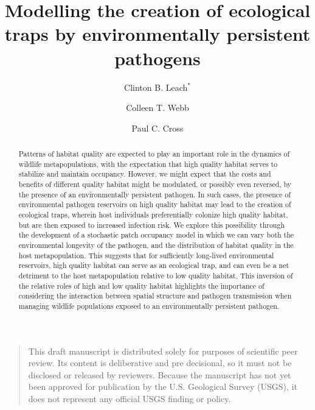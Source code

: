 \documentclass{article}
\begin{document}
\title{Modelling the creation of ecological traps by environmentally persistent pathogens}

\author[1]{Clinton B. Leach$^*$}
\author[1]{Colleen T. Webb}
\author[2]{Paul C. Cross}


\maketitle


\begin{quote}
This draft manuscript is distributed solely for purposes of scientific peer review.  Its content is deliberative and pre decisional, so it must not be disclosed or released by reviewers.  Because the manuscript has not yet been approved for publication by the U.S. Geological Survey (USGS), it does not represent any official USGS finding or policy.
\end{quote}


\begin{abstract} 
Patterns of habitat quality are expected to play an important role in the dynamics of wildlife metapopulations, with the expectation that high quality habitat serves to stabilize and maintain occupancy.  However, we might expect that the costs and benefits of different quality habitat might be modulated, or possibly even reversed, by the presence of an environmentally persistent pathogen.  In such cases, the presence of environmental pathogen reservoirs on high quality habitat may lead to the creation of ecological traps, wherein host individuals preferentially colonize high quality habitat, but are then exposed to increased infection risk.  We explore this possibility through the development of a stochastic patch occupancy model in which we can vary both the environmental longevity of the pathogen, and the distribution of habitat quality in the host metapopulation.  This suggests that for sufficiently long-lived environmental reservoirs, high quality habitat can serve as an ecological trap, and can even be a net detriment to the host metapopulation relative to low quality habitat.  This inversion of the relative roles of high and low quality habitat highlights the importance of considering the interaction between spatial structure and pathogen transmission when managing wildlife populations exposed to an environmentally persistent pathogen.
\end{abstract}
\end{document}
